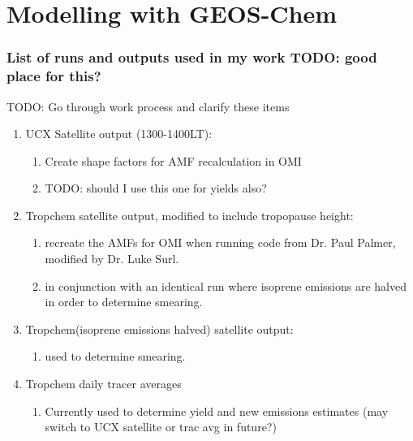 
\chapter{Modelling with GEOS-Chem} %
\label{Model} %
  \subsection{List of runs and outputs used in my work TODO: good place for this?}
  TODO: Go through work process and clarify these items
    \begin{enumerate}
      \item UCX Satellite output (1300-1400LT): 
      \begin{enumerate}
        \item Create shape factors for AMF recalculation in OMI
        \item TODO: should I use this one for yields also?
      \end{enumerate}
      \item Tropchem satellite output, modified to include tropopause height:
      \begin{enumerate}
        \item recreate the AMFs for OMI when running code from Dr. Paul Palmer, modified by Dr. Luke Surl.
        \item in conjunction with an identical run where isoprene emissions are halved in order to determine smearing.
      \end{enumerate}
      \item Tropchem(isoprene emissions halved) satellite output:
      \begin{enumerate}
        \item used to determine smearing.
      \end{enumerate}
      \item Tropchem daily tracer averages
      \begin{enumerate}
        \item Currently used to determine yield and new emissions estimates (may switch to UCX satellite or trac avg in future?)
      \end{enumerate}
    \end{enumerate}
    

